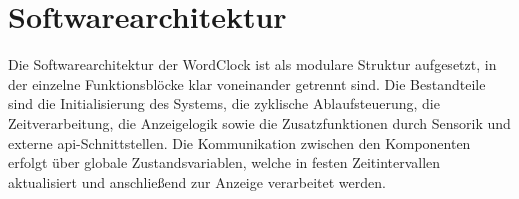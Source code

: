 \section{Softwarearchitektur}
Die Softwarearchitektur der WordClock ist als modulare Struktur aufgesetzt, in der einzelne Funktionsblöcke klar voneinander getrennt sind. 
Die Bestandteile sind die Initialisierung des Systems, die zyklische Ablaufsteuerung, die Zeitverarbeitung, die Anzeigelogik sowie die Zusatzfunktionen durch Sensorik und externe \gls{api}-Schnittstellen.
Die Kommunikation zwischen den Komponenten erfolgt über globale Zustandsvariablen, welche in festen Zeitintervallen aktualisiert und anschließend zur Anzeige verarbeitet werden.